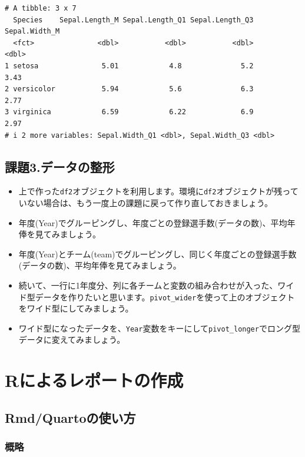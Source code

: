 \documentclass[
  a4paper,
]{ltjsbook}
\providecommand{\tightlist}{%
  \setlength{\itemsep}{0pt}\setlength{\parskip}{0pt}}
\begin{document}
\begin{verbatim}
# A tibble: 3 x 7
  Species    Sepal.Length_M Sepal.Length_Q1 Sepal.Length_Q3 Sepal.Width_M
  <fct>               <dbl>           <dbl>           <dbl>         <dbl>
1 setosa               5.01            4.8              5.2          3.43
2 versicolor           5.94            5.6              6.3          2.77
3 virginica            6.59            6.22             6.9          2.97
# i 2 more variables: Sepal.Width_Q1 <dbl>, Sepal.Width_Q3 <dbl>
\end{verbatim}

\section{課題3.データの整形}\label{ux8ab2ux984c3.ux30c7ux30fcux30bfux306eux6574ux5f62}

\begin{itemize}
\tightlist
\item
  上で作った\texttt{df2}オブジェクトを利用します。環境に\texttt{df2}オブジェクトが残っていない場合は、もう一度上の課題に戻って作り直しておきましょう。
\item
  年度(Year)でグルーピングし、年度ごとの登録選手数(データの数)、平均年俸を見てみましょう。
\item
  年度(Year)とチーム(team)でグルーピングし、同じく年度ごとの登録選手数(データの数)、平均年俸を見てみましょう。
\item
  続いて、一行に1年度分、列に各チームと変数の組み合わせが入った、ワイド型データを作りたいと思います。\texttt{pivot\_wider}を使って上のオブジェクトをワイド型にしてみましょう。
\item
  ワイド型になったデータを、\texttt{Year}変数をキーにして\texttt{pivot\_longer}でロング型データに変えてみましょう。
\end{itemize}


\chapter{Rによるレポートの作成}\label{rux306bux3088ux308bux30ecux30ddux30fcux30c8ux306eux4f5cux6210}

\section{Rmd/Quartoの使い方}\label{rmdquartoux306eux4f7fux3044ux65b9}

\subsection{概略}\label{ux6982ux7565}
\end{document}
